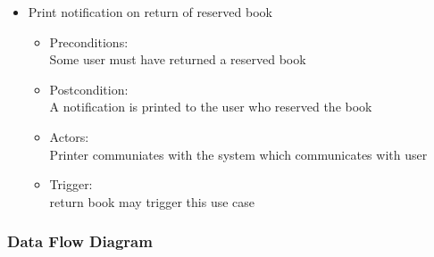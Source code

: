 \documentclass{article}
\begin{document}
\begin{enumerate}
\begin{itemize}
\item Print notification on return of reserved book\\ 
\begin{itemize}
\item Preconditions:\\ Some user must have returned a reserved book \\ 
 \item Postcondition:\\ A notification is printed to the user who reserved the book\\ 
 \item Actors: \\ Printer communiates with the system which communicates with user\\ 
 \item Trigger:\\ return book may trigger this use case\\ 
\end{itemize}

\end{itemize}
\end{enumerate}

\subsubsection*{Data Flow Diagram}
\end{document}
